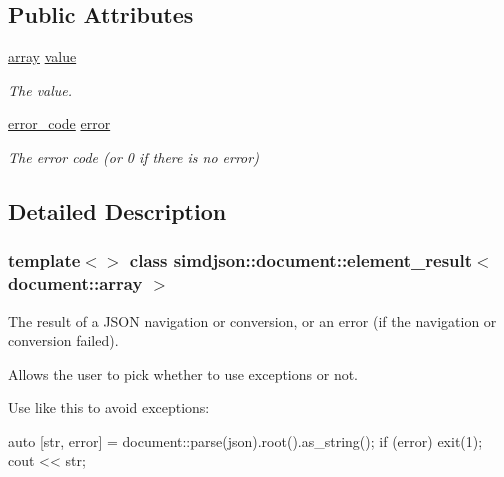\subsection*{Public Attributes}
\begin{DoxyCompactItemize}
\item 
\mbox{\label{classsimdjson_1_1document_1_1element__result_3_01document_1_1array_01_4_a2b9e99aedf1d1c2760aefee088144e61}} 
\hyperlink{classsimdjson_1_1document_1_1array}{array} \hyperlink{classsimdjson_1_1document_1_1element__result_3_01document_1_1array_01_4_a2b9e99aedf1d1c2760aefee088144e61}{value}
\begin{DoxyCompactList}\small\item\em The value. \end{DoxyCompactList}\item 
\mbox{\label{classsimdjson_1_1document_1_1element__result_3_01document_1_1array_01_4_aa36a7760b8ba8a522969cf0e87eba4c9}} 
\hyperlink{namespacesimdjson_a7b735a3a50ba79e3f7f14df5f77d8da9}{error\+\_\+code} \hyperlink{classsimdjson_1_1document_1_1element__result_3_01document_1_1array_01_4_aa36a7760b8ba8a522969cf0e87eba4c9}{error}
\begin{DoxyCompactList}\small\item\em The error code (or 0 if there is no error) \end{DoxyCompactList}\end{DoxyCompactItemize}


\subsection{Detailed Description}
\subsubsection*{template$<$$>$\newline
class simdjson\+::document\+::element\+\_\+result$<$ document\+::array $>$}

The result of a J\+S\+ON navigation or conversion, or an error (if the navigation or conversion failed). 

Allows the user to pick whether to use exceptions or not.

Use like this to avoid exceptions\+: \begin{DoxyVerb}auto [str, error] = document::parse(json).root().as_string();
if (error) { exit(1); }
cout << str;
\end{DoxyVerb}


